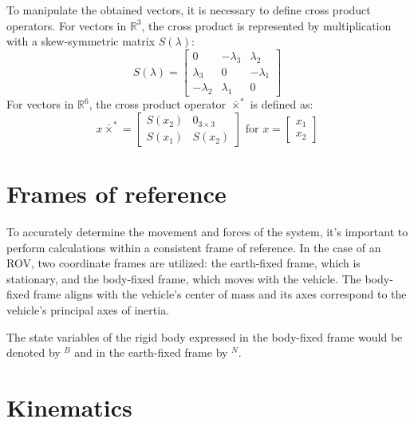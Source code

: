     To manipulate the obtained vectors, it is necessary to define cross product 
    operators. For vectors in \( \mathbb{R}^3 \), the cross product is represented 
    by multiplication with a skew-symmetric matrix \( S(\lambda) \):
    \begin{equation}
        S(\lambda) = \begin{bmatrix}
            0 & -\lambda_3 & \lambda_2 \\
            \lambda_3 & 0 & -\lambda_1 \\
            -\lambda_2 & \lambda_1 & 0
        \end{bmatrix}
    \end{equation} 
    For vectors in \( \mathbb{R}^6 \), the cross product operator 
    \( \bar{\times}^* \) is defined as:
    \begin{equation}
        x \bar{\times}^* = \begin{bmatrix}
            S(x_2) & 0_{3 \times 3} \\
            S(x_1) & S(x_2)
        \end{bmatrix}
        \text{ for } x = \begin{bmatrix}
            x_1 \\
            x_2 
        \end{bmatrix}
    \end{equation}

\section{Frames of reference}

    To accurately determine the movement and forces of the system, it's important to perform calculations within a consistent frame of reference. In the case of an ROV, two coordinate frames are utilized: the earth-fixed frame, which is stationary, and the body-fixed frame, which moves with the vehicle. The body-fixed frame aligns with the vehicle's center of mass and its axes correspond to the vehicle's principal axes of inertia.

    The state variables of the rigid body expressed in the body-fixed frame would be denoted by $^B$ and in the earth-fixed frame by $^N$.

\section{Kinematics}

